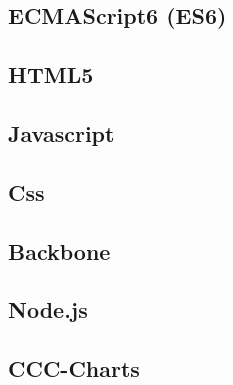 	\subsection{ECMAScript6 (ES6)}
			\lipsum[1-2]
	\subsection{HTML5}
			\lipsum[1-2]
	\subsection{Javascript}
			\lipsum[1-2]
	\subsection{Css}
			\lipsum[1-2]
	\subsection{Backbone}
			\lipsum[1-2]
	\subsection{Node.js}
			\lipsum[1-2]
	\subsection{CCC-Charts}
			\lipsum[1-2]

		
		
		
		
